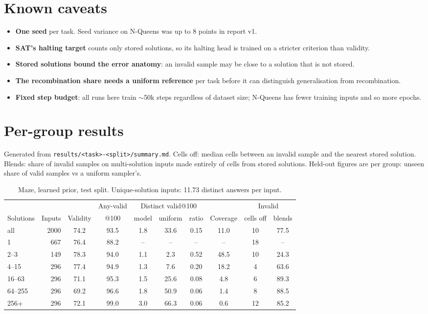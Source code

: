 \documentclass[11pt]{article}
\begin{document}
\section{Known caveats}

\begin{itemize}
  \item \textbf{One seed} per task. Seed variance on N-Queens was up to 8 points in report v1.
  \item \textbf{SAT's halting target} counts only stored solutions, so its halting head is trained on a stricter
  criterion than validity.
  \item \textbf{Stored solutions bound the error anatomy}: an invalid sample may be close to a solution that is not
  stored.
  \item \textbf{The recombination share needs a uniform reference} per task before it can distinguish generalisation
  from recombination.
  \item \textbf{Fixed step budget}: all runs here train $\sim$50k steps regardless of dataset size; N-Queens has fewer
  training inputs and so more epochs.
\end{itemize}

\appendix
\section{Per-group results}
\label{app:groups}

Generated from \texttt{results/<task>-<split>/summary.md}. Cells off: median cells between an invalid sample and the
nearest stored solution. Blends: share of invalid samples on multi-solution inputs made entirely of cells from stored
solutions. Held-out figures are per group: unseen share of valid samples vs a uniform sampler's.

\begin{table}[H]
\centering\small
\begin{tabular}{@{}lrcccccccc@{}}
\toprule
& & & Any-valid & \multicolumn{3}{c}{Distinct valid@100} & & \multicolumn{2}{c}{Invalid} \\
\cmidrule(lr){5-7}\cmidrule(l){9-10}
Solutions & Inputs & Validity & @100 & model & uniform & ratio & Coverage & cells off & blends \\
\midrule
all & 2000 & 74.2 & 93.5 & 1.8 & 33.6 & 0.15 & 11.0 & 10 & 77.5 \\
1 & 667 & 76.4 & 88.2 & -- & -- & -- & -- & 18 & -- \\
2--3 & 149 & 78.3 & 94.0 & 1.1 & 2.3 & 0.52 & 48.5 & 10 & 24.3 \\
4--15 & 296 & 77.4 & 94.9 & 1.3 & 7.6 & 0.20 & 18.2 & 4 & 63.6 \\
16--63 & 296 & 71.1 & 95.3 & 1.5 & 25.6 & 0.08 & 4.8 & 6 & 89.3 \\
64--255 & 296 & 69.2 & 96.6 & 1.8 & 50.9 & 0.06 & 1.4 & 8 & 88.5 \\
256+ & 296 & 72.1 & 99.0 & 3.0 & 66.3 & 0.06 & 0.6 & 12 & 85.2 \\
\bottomrule
\end{tabular}
\caption{Maze, learned prior, test split. Unique-solution inputs: 11.73 distinct answers per input.}
\end{table}
\end{document}
